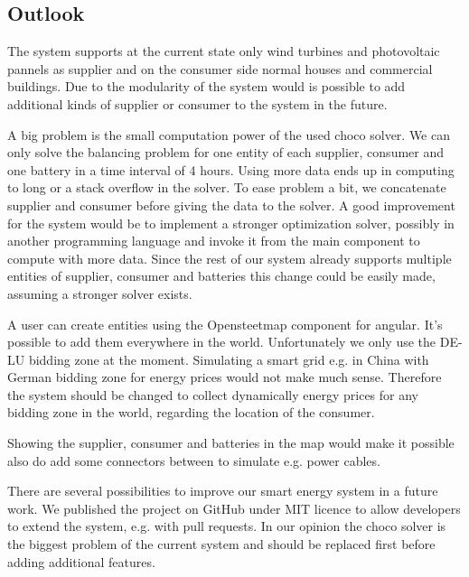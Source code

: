 \subsection{Outlook}
The system supports at the current state only wind turbines and photovoltaic pannels as supplier and on the consumer side normal houses and commercial buildings.
Due to the modularity of the system would is possible to add additional kinds of supplier or consumer to the system in the future.

A big problem is the small computation power of the used choco solver.
We can only solve the balancing problem for one entity of each supplier, consumer and one battery in a time interval of 4 hours.
Using more data ends up in computing to long or a stack overflow in the solver.
To ease problem a bit, we concatenate supplier and consumer before giving the data to the solver.
A good improvement for the system would be to implement a stronger optimization solver, possibly in another programming language and invoke it from the main component to compute with more data.
Since the rest of our system already supports multiple entities of supplier, consumer and batteries this change could be easily made, assuming a stronger solver exists.

A user can create entities using the Opensteetmap component for angular.
It's possible to add them everywhere in the world.
Unfortunately we only use the DE-LU bidding zone at the moment.
Simulating a smart grid e.g. in China with German bidding zone for energy prices would not make much sense.
Therefore the system should be changed to collect dynamically energy prices for any bidding zone in the world, regarding the location of the consumer.

Showing the supplier, consumer and batteries in the map would make it possible also do add some connectors between to simulate e.g. power cables.

There are several possibilities to improve our smart energy system in a future work.
We published the project on GitHub under MIT licence to allow developers to extend the system, e.g. with pull requests.
In our opinion the choco solver is the biggest problem of the current system and should be replaced first before adding additional features.